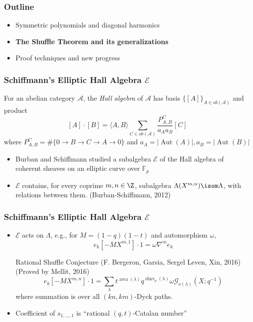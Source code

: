 \documentclass{beamer}
\newcommand{\sym}{\Lambda}
\DeclareMathOperator{\area}{area}
\DeclareMathOperator{\dinv}{dinv}
\newcommand{\Gcal}{\mathcal{G}}
\newcommand{\Ecal}{{\mathcal E}}
\newcommand{\Acal}{{\mathcal A}}
\DeclareMathOperator{\Aut}{Aut}
\newcommand{\F}{\mathbb{F}}
\newcounter{c}
\begin{document}
\begin{frame}
  \frametitle{Outline}
  \begin{itemize}
  \item Symmetric polynomials and diagonal harmonics 
  \item \textbf{The Shuffle Theorem and its generalizations}
  \item Proof techniques and new progress
  \end{itemize}
\end{frame}
\begin{frame}
  \frametitle{Schiffmann's Elliptic Hall Algebra \(\Ecal\)}
  For an abelian category \(\Acal\), the \emph{Hall algebra} of
  \(\Acal\) has basis \(\{[A]\}_{A \in ob(\Acal)}\) and product
  \pause \[
    [A] \cdot [B] = \langle A,B \rangle \sum_{C \in ob(\Acal)}
    \frac{P_{A,B}^C}{a_A a_B} [C]
  \]
  where \(P_{A,B}^C = \# \{0 \to B \to C \to A \to 0\}\) and \(a_A =
  |\Aut(A)|, a_B = |\Aut(B)|\)\pause
  \begin{itemize}
  \item Burban and Schiffmann studied a subalgebra \(\Ecal\) of the
    Hall algebra of coherent sheaves on an elliptic curve over \(\F_p\)\pause
  \item \(\Ecal\) contains, for every coprime \(m,n \in \Z\), subalgebra \(\sym(X^{m,n})
    \isom \sym\), with relations between them. (Burban-Schiffmann, 2012)
  \end{itemize}
\end{frame}
\begin{frame}
  \frametitle{Schiffmann's Elliptic Hall Algebra \(\Ecal\)}
  \begin{itemize}
  \item \(\Ecal\) acts on \(\sym\), e.g., for \(M = (1-q)(1-t)\) and
    automorphism \(\omega\), \[
      e_k[-MX^{m,1}] \cdot 1 = \omega \nabla^m e_k
    \]\pause
  \begin{block}{Rational Shuffle Conjecture (F. Bergeron, Garsia,
      Sergel Leven, Xin, 2016) (Proved by Mellit, 2016)}
    \[e_k[-MX^{m,n}] \cdot 1 = \sum_\lambda t^{\area(\lambda)}
    q^{\dinv_p(\lambda)} \omega \Gcal_{\nu(\lambda)}(X;q^{-1})\]
  where summation is over all \((kn,km)\)-Dyck paths.
  \end{block}\pause
  \item Coefficient of \(s_{1,\ldots,1}\) is ``rational \((q,t)\)-Catalan number''
  \end{itemize}
\end{frame}
\end{document}
